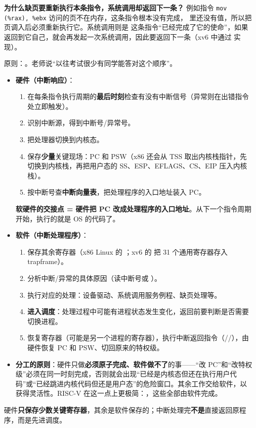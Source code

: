 \textbf{为什么缺页要重新执行本条指令，系统调用却返回下一条？} 例如指令 \texttt{mov (\%rax), \%ebx} 访问的页不在内存，这条指令根本没有完成， 里还没有值，所以把页调入后必须重新执行它。系统调用则是  这条指令“已经完成了它的使命”，如果返回到它自己，就会再发起一次系统调用，因此要返回下一条（xv6 中通过  实现）。

原则：。老师说“以往考试很少有同学能答对这个顺序”。
\begin{itemize}
    \item \textbf{硬件（中断响应）}：
    \begin{enumerate}
        \item 在每条指令执行周期的\textbf{最后时刻}检查有没有中断信号（异常则在出错指令处立即触发）。
        \item 识别中断源，得到中断号/异常号。
        \item 把处理器切换到内核态。
        \item 保存\textbf{少量}关键现场：PC 和 PSW（x86 还会从 TSS 取出内核栈指针，先切换到内核栈，再把用户态的 SS、ESP、EFLAGS、CS、EIP 压入内核栈）。
        \item 按中断号查\textbf{中断向量表}，把处理程序的入口地址装入 PC。
    \end{enumerate}
    \textbf{软硬件的交接点 = 硬件把 PC 改成处理程序的入口地址}。从下一个指令周期开始，执行的就是 OS 的代码了。
    \item \textbf{软件（中断处理程序）}：
    \begin{enumerate}
        \item 保存其余寄存器（x86 Linux 的 ；xv6 的  把 31 个通用寄存器存入 trapframe）。
        \item 分析中断/异常的具体原因（读中断号或 ）。
        \item 执行对应的处理：设备驱动、系统调用服务例程、缺页处理等。
        \item \textbf{进入调度}：处理过程中可能有进程状态发生变化，返回前要判断是否需要切换进程。
        \item 恢复寄存器（可能是另一个进程的寄存器），执行中断返回指令（//），由硬件恢复 PC 和 PSW、切回原来的特权级。
    \end{enumerate}
    \item \textbf{分工的原则}：硬件只做\textbf{必须原子完成、软件做不了}的事——“改 PC”和“改特权级”必须在同一时刻完成，否则就会出现“已经是内核态但还在执行用户代码”或“已经跳进内核代码但还是用户态”的危险窗口。其余工作交给软件，以获得灵活性。RISC-V 在这一点上更极简：，这些全部由软件完成。
\end{itemize}
\ez 硬件\textbf{只保存少数关键寄存器}，其余是软件保存的；中断处理完\textbf{不是}直接返回原程序，而是先进调度。

